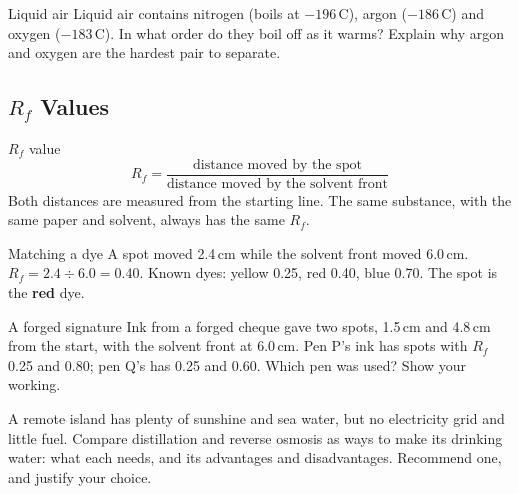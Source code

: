\begin{wedo}{Liquid air}
Liquid air contains nitrogen (boils at $-196$\,\textdegree C), argon ($-186$\,\textdegree C) and oxygen ($-183$\,\textdegree C). In what order do they boil off as it warms? Explain why argon and oxygen are the hardest pair to separate.
\answerbox{4.5cm}
\end{wedo}

\subsection{$R_f$ Values}\label{sub:a5.2}

\begin{skillbox}{$R_f$ value}
\[ R_f = \frac{\text{distance moved by the spot}}{\text{distance moved by the solvent front}} \]
Both distances are measured from the starting line. The same substance, with the same paper and solvent, always has the same $R_f$.
\end{skillbox}

\begin{workedex}{Matching a dye}
A spot moved 2.4\,cm while the solvent front moved 6.0\,cm. $R_f = 2.4 \div 6.0 = \mathbf{0.40}$. Known dyes: yellow 0.25, red 0.40, blue 0.70. The spot is the \textbf{red} dye.
\end{workedex}

\begin{wedo}{A forged signature}
Ink from a forged cheque gave two spots, 1.5\,cm and 4.8\,cm from the start, with the solvent front at 6.0\,cm. Pen P's ink has spots with $R_f$ 0.25 and 0.80; pen Q's has 0.25 and 0.60. Which pen was used? Show your working.
\workbox{5cm}
\end{wedo}

\label{prac:5}


\label{ext:5}

\task A remote island has plenty of sunshine and sea water, but no electricity grid and little fuel. Compare distillation and reverse osmosis as ways to make its drinking water: what each needs, and its advantages and disadvantages. Recommend one, and justify your choice.
\answerbox{9cm}

\clearpage
